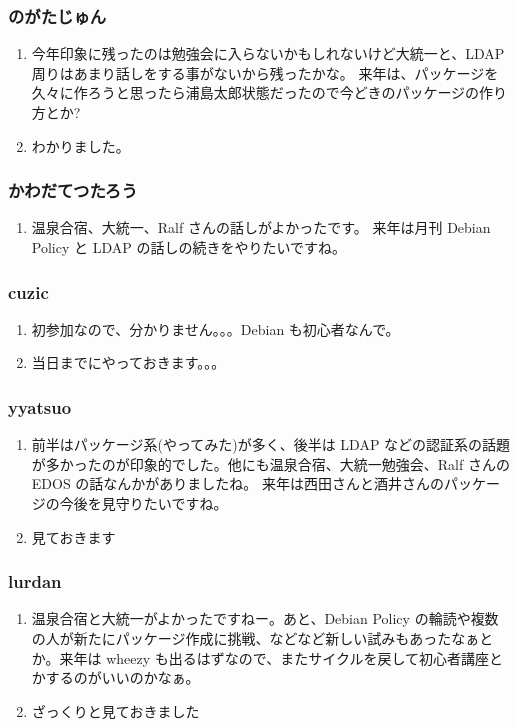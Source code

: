 \documentclass[cjk,dvipdfmx,10pt,compress,%
hyperref={bookmarks=true,bookmarksnumbered=true,bookmarksopen=false,%
colorlinks=false,%
pdftitle={第 67 回 関西 Debian 勉強会},%
pdfauthor={倉敷・のがた・佐々木・かわだ},%
pdfsubject={資料},%
}]{beamer}
\begin{document}
\begin{frame}
  \frametitle{ のがたじゅん }
  \begin{enumerate}
  \item 今年印象に残ったのは勉強会に入らないかもしれないけど大統一と、LDAP周りはあまり話しをする事がないから残ったかな。
    来年は、パッケージを久々に作ろうと思ったら浦島太郎状態だったので今どきのパッケージの作り方とか?
  \item わかりました。
  \end{enumerate}
\end{frame}

\begin{frame}
  \frametitle{ かわだてつたろう }
  \begin{enumerate}
  \item 温泉合宿、大統一、Ralf さんの話しがよかったです。
    来年は月刊 Debian Policy と LDAP の話しの続きをやりたいですね。
  \end{enumerate}
\end{frame}

\begin{frame}
  \frametitle{ cuzic }
  \begin{enumerate}
  \item 初参加なので、分かりません。。。Debian も初心者なんで。
  \item 当日までにやっておきます。。。
  \end{enumerate}
\end{frame}

\begin{frame}
  \frametitle{ yyatsuo }
  \begin{enumerate}
  \item 前半はパッケージ系(やってみた)が多く、後半は LDAP などの認証系の話題が多かったのが印象的でした。他にも温泉合宿、大統一勉強会、Ralf さんの EDOS の話なんかがありましたね。
    来年は西田さんと酒井さんのパッケージの今後を見守りたいですね。
  \item 見ておきます
  \end{enumerate}
\end{frame}

\begin{frame}
  \frametitle{ lurdan }
  \begin{enumerate}
  \item 温泉合宿と大統一がよかったですねー。あと、Debian Policy の輪読や複数の人が新たにパッケージ作成に挑戦、などなど新しい試みもあったなぁとか。来年は wheezy も出るはずなので、またサイクルを戻して初心者講座とかするのがいいのかなぁ。
  \item ざっくりと見ておきました
  \end{enumerate}
\end{frame}
\end{document}
